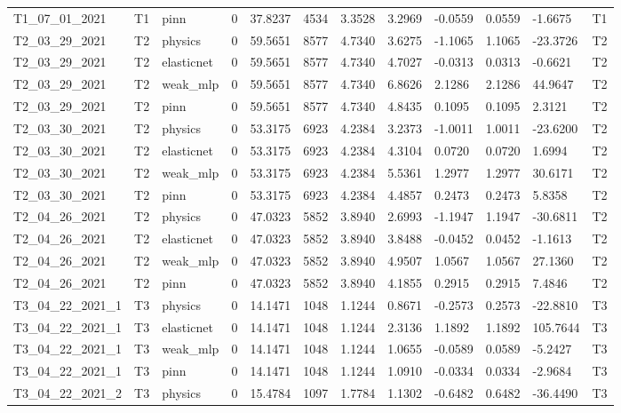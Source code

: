 \begin{table}[t]
\begin{tabular}{llllllllllll}
T1\_07\_01\_2021 & T1 & pinn & 0 & 37.8237 & 4534 & 3.3528 & 3.2969 & -0.0559 & 0.0559 & -1.6675 & T1 \\
T2\_03\_29\_2021 & T2 & physics & 0 & 59.5651 & 8577 & 4.7340 & 3.6275 & -1.1065 & 1.1065 & -23.3726 & T2 \\
T2\_03\_29\_2021 & T2 & elasticnet & 0 & 59.5651 & 8577 & 4.7340 & 4.7027 & -0.0313 & 0.0313 & -0.6621 & T2 \\
T2\_03\_29\_2021 & T2 & weak\_mlp & 0 & 59.5651 & 8577 & 4.7340 & 6.8626 & 2.1286 & 2.1286 & 44.9647 & T2 \\
T2\_03\_29\_2021 & T2 & pinn & 0 & 59.5651 & 8577 & 4.7340 & 4.8435 & 0.1095 & 0.1095 & 2.3121 & T2 \\
T2\_03\_30\_2021 & T2 & physics & 0 & 53.3175 & 6923 & 4.2384 & 3.2373 & -1.0011 & 1.0011 & -23.6200 & T2 \\
T2\_03\_30\_2021 & T2 & elasticnet & 0 & 53.3175 & 6923 & 4.2384 & 4.3104 & 0.0720 & 0.0720 & 1.6994 & T2 \\
T2\_03\_30\_2021 & T2 & weak\_mlp & 0 & 53.3175 & 6923 & 4.2384 & 5.5361 & 1.2977 & 1.2977 & 30.6171 & T2 \\
T2\_03\_30\_2021 & T2 & pinn & 0 & 53.3175 & 6923 & 4.2384 & 4.4857 & 0.2473 & 0.2473 & 5.8358 & T2 \\
T2\_04\_26\_2021 & T2 & physics & 0 & 47.0323 & 5852 & 3.8940 & 2.6993 & -1.1947 & 1.1947 & -30.6811 & T2 \\
T2\_04\_26\_2021 & T2 & elasticnet & 0 & 47.0323 & 5852 & 3.8940 & 3.8488 & -0.0452 & 0.0452 & -1.1613 & T2 \\
T2\_04\_26\_2021 & T2 & weak\_mlp & 0 & 47.0323 & 5852 & 3.8940 & 4.9507 & 1.0567 & 1.0567 & 27.1360 & T2 \\
T2\_04\_26\_2021 & T2 & pinn & 0 & 47.0323 & 5852 & 3.8940 & 4.1855 & 0.2915 & 0.2915 & 7.4846 & T2 \\
T3\_04\_22\_2021\_1 & T3 & physics & 0 & 14.1471 & 1048 & 1.1244 & 0.8671 & -0.2573 & 0.2573 & -22.8810 & T3 \\
T3\_04\_22\_2021\_1 & T3 & elasticnet & 0 & 14.1471 & 1048 & 1.1244 & 2.3136 & 1.1892 & 1.1892 & 105.7644 & T3 \\
T3\_04\_22\_2021\_1 & T3 & weak\_mlp & 0 & 14.1471 & 1048 & 1.1244 & 1.0655 & -0.0589 & 0.0589 & -5.2427 & T3 \\
T3\_04\_22\_2021\_1 & T3 & pinn & 0 & 14.1471 & 1048 & 1.1244 & 1.0910 & -0.0334 & 0.0334 & -2.9684 & T3 \\
T3\_04\_22\_2021\_2 & T3 & physics & 0 & 15.4784 & 1097 & 1.7784 & 1.1302 & -0.6482 & 0.6482 & -36.4490 & T3 \\

\end{tabular}
\end{table}
